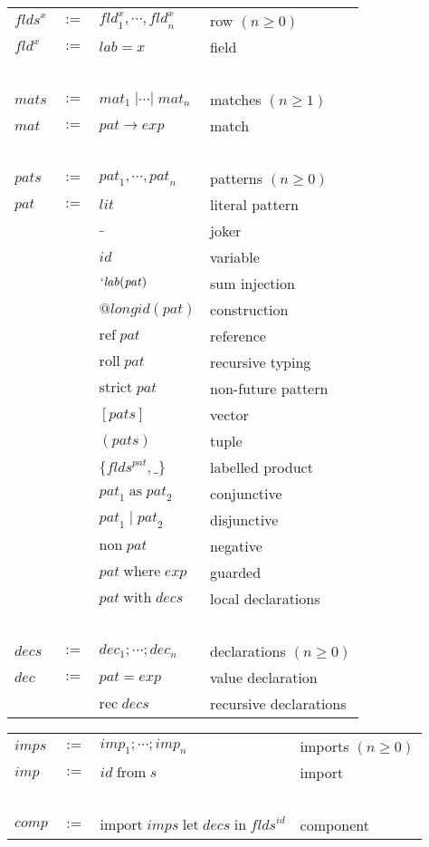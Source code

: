 \documentclass[twoside]{article}
\newcommand{\x}[1]{\mathit{#1}}
\newcommand{\f}[1]{\mbox{#1}}
\newcommand{\lab}{\x{lab}}
\newcommand{\id}{\x{id}}
\newcommand{\longid}{\x{longid}}
\newcommand{\lit}{\x{lit}}
\renewcommand{\exp}{\x{exp}}
\newcommand{\fld}{\x{fld}}
\newcommand{\flds}{\x{flds}}
\newcommand{\mat}{\x{mat}}
\newcommand{\mats}{\x{mats}}
\newcommand{\pat}{\x{pat}}
\newcommand{\pats}{\x{pats}}
\newcommand{\dec}{\x{dec}}
\newcommand{\decs}{\x{decs}}
\newcommand{\imp}{\x{imp}}
\newcommand{\imps}{\x{imps}}
\newcommand{\comp}{\x{comp}}
\begin{document}
\begin{center}
\begin{tabular}{lcll}
$\flds^x$&$:=$&	$\fld^x_1,\cdots,\fld^x_n$	& row $(n\geq0)$ \\
$\fld^x$ &$:=$& $\lab = x$			& field \\
\ \\

$\mats$	&$:=$&	$\mat_1\;|\cdots|\;\mat_n$	& matches $(n\geq1)$ \\
$\mat$	&$:=$&	$\pat\to\exp$			& match \\
\ \\

$\pats$	&$:=$&	$\pat_1,\cdots,\pat_n$		& patterns $(n\geq0)$ \\
$\pat$	&$:=$&	$\lit$				& literal pattern \\
	&&	$\f{\_}$			& joker \\
	&&	$\id$				& variable \\
	&&	$`\lab(\pat)$			& sum injection \\
	&&	$@\longid(\pat)$		& construction \\
	&&	$\f{ref}\;\pat$			& reference \\
	&&	$\f{roll}\;\pat$		& recursive typing \\
	&&	$\f{strict}\;\pat$		& non-future pattern \\
	&&	$[\pats]$			& vector \\
	&&	$(\pats)$			& tuple \\
	&&	$\{\flds^\pat,\_\}$		& labelled product \\
	&&	$\pat_1\;\f{as}\;\pat_2$	& conjunctive \\
	&&	$\pat_1\;|\;\pat_2$		& disjunctive \\
	&&	$\f{non}\;\pat$			& negative \\
	&&	$\pat\;\f{where}\;\exp$		& guarded \\
	&&	$\pat\;\f{with}\;\decs$		& local declarations \\
\ \\

$\decs$	&$:=$&	$\dec_1;\cdots;\dec_n$		& declarations $(n\geq0)$ \\
$\dec$	&$:=$&	$\pat = \exp$			& value declaration \\
	&&	$\f{rec}\;\decs$		& recursive declarations \\
\end{tabular}
\end{center}

\begin{center}
\begin{tabular}{lcll}

$\imps$	&$:=$&	$\imp_1;\cdots;\imp_n$		& imports $(n\geq0)$ \\
$\imp$	&$:=$&	$\id\;\f{from}\;s$		& import \\
\ \\

$\comp$	&$:=$&	$\f{import}\;\imps\;\f{let}\;\decs\;\f{in}\;\flds^\id$
						& component

\end{tabular}
\end{center}
\end{document}
